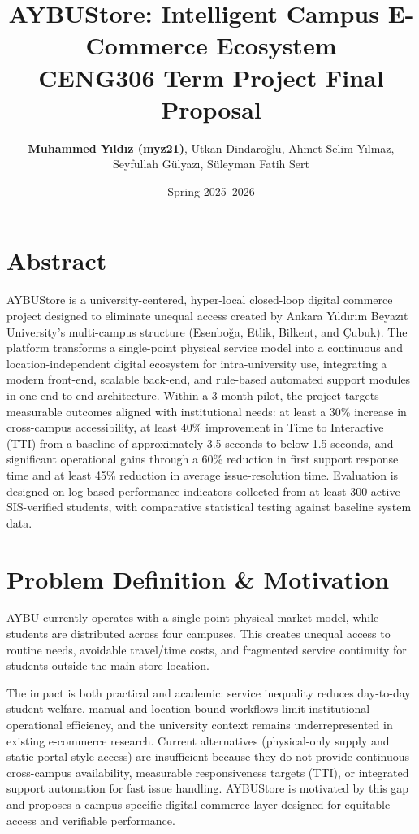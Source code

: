 \documentclass[11pt,a4paper]{article}
\title{\LARGE \textbf{AYBUStore: Intelligent Campus E-Commerce Ecosystem}\\[0.5em] \large \textbf{CENG306 Term Project Final Proposal}}
\author{\textbf{Muhammed Yıldız (myz21)}, Utkan Dindaroğlu, Ahmet Selim Yılmaz, \\ Seyfullah Gülyazı, Süleyman Fatih Sert}
\date{Spring 2025--2026}
\begin{document}
\maketitle

\section{Abstract}
AYBUStore is a university-centered, hyper-local closed-loop digital commerce project designed to eliminate unequal access created by Ankara Yıldırım Beyazıt University's multi-campus structure (Esenboğa, Etlik, Bilkent, and Çubuk). The platform transforms a single-point physical service model into a continuous and location-independent digital ecosystem for intra-university use, integrating a modern front-end, scalable back-end, and rule-based automated support modules in one end-to-end architecture. Within a 3-month pilot, the project targets measurable outcomes aligned with institutional needs: at least a 30\% increase in cross-campus accessibility, at least 40\% improvement in Time to Interactive (TTI) from a baseline of approximately 3.5 seconds to below 1.5 seconds, and significant operational gains through a 60\% reduction in first support response time and at least 45\% reduction in average issue-resolution time. Evaluation is designed on log-based performance indicators collected from at least 300 active SIS-verified students, with comparative statistical testing against baseline system data.

\section{Problem Definition \& Motivation}
AYBU currently operates with a single-point physical market model, while students are distributed across four campuses. This creates unequal access to routine needs, avoidable travel/time costs, and fragmented service continuity for students outside the main store location.

The impact is both practical and academic: service inequality reduces day-to-day student welfare, manual and location-bound workflows limit institutional operational efficiency, and the university context remains underrepresented in existing e-commerce research. Current alternatives (physical-only supply and static portal-style access) are insufficient because they do not provide continuous cross-campus availability, measurable responsiveness targets (TTI), or integrated support automation for fast issue handling. AYBUStore is motivated by this gap and proposes a campus-specific digital commerce layer designed for equitable access and verifiable performance.
\end{document}
